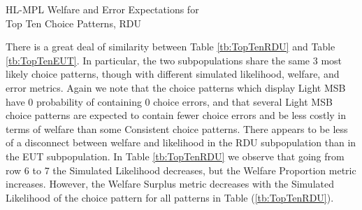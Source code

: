 \documentclass[../main.tex]{subfiles}
\begin{document}
\begin{table}[ht]
	\centering
	\caption{HL-MPL Welfare and Error Expectations for\\Top Ten Choice Patterns, RDU}
	\label{tb:TopTenRDU}
	\begin{adjustbox}{width=1\textwidth}
	\end{adjustbox}
\end{table}

There is a great deal of similarity between Table \ref{tb:TopTenRDU} and Table \ref{tb:TopTenEUT}.
In particular, the two subpopulations share the same $3$ most likely choice patterns, though with different simulated likelihood, welfare, and error metrics.
Again we note that the choice patterns which display Light MSB have $0$ probability of containing $0$ choice errors, and that several Light MSB choice patterns are expected to contain fewer choice errors and be less costly in terms of welfare than some Consistent choice patterns.
There appears to be less of a disconnect between welfare and likelihood in the RDU subpopulation than in the EUT subpopulation. 
In Table \ref{tb:TopTenRDU} we observe that going from row 6 to 7 the Simulated Likelihood decreases, but the Welfare Proportion metric increases.
However, the Welfare Surplus metric decreases with the Simulated Likelihood of the choice pattern for all patterns in Table (\ref{tb:TopTenRDU}).
\end{document}
